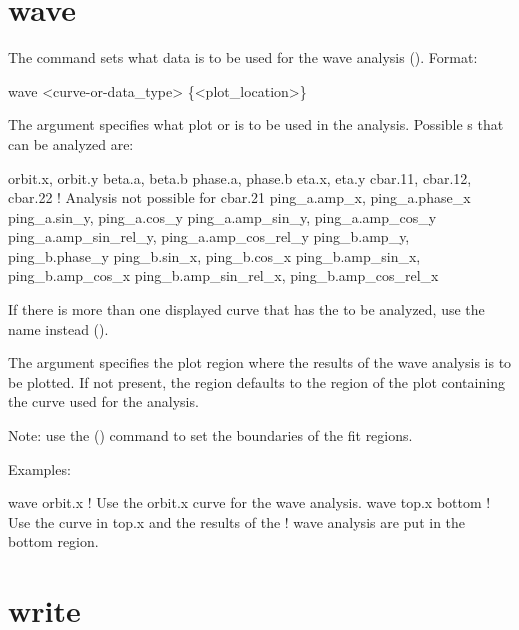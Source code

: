 {{{{{{{{{{{\section{wave}
\label{s:wave}

The  command sets what data is to be used for the wave analysis (). 
Format:
\begin{example}
  wave <curve-or-data_type> \{<plot_location>\}
\end{example}

\vskip 7pt

The  argument specifies what plot  or  is to be
used in the analysis. Possible s that can be analyzed are:
\begin{example}
  orbit.x, orbit.y
  beta.a,  beta.b
  phase.a, phase.b
  eta.x, eta.y
  cbar.11, cbar.12, cbar.22      ! Analysis not possible for cbar.21
  ping_a.amp_x, ping_a.phase_x
  ping_a.sin_y, ping_a.cos_y
  ping_a.amp_sin_y, ping_a.amp_cos_y
  ping_a.amp_sin_rel_y, ping_a.amp_cos_rel_y
  ping_b.amp_y, ping_b.phase_y
  ping_b.sin_x, ping_b.cos_x
  ping_b.amp_sin_x, ping_b.amp_cos_x
  ping_b.amp_sin_rel_x, ping_b.amp_cos_rel_x
\end{example}
If there is more than one displayed curve that has the  to be analyzed, use the
 name instead ().

The  argument specifies the plot region where the results of the wave analysis
is to be plotted. If not present, the region defaults to the region of the plot containing the curve
used for the analysis.

Note: use the  () command to set the boundaries of the fit regions.

Examples:
\begin{example}
  wave orbit.x      ! Use the orbit.x curve for the wave analysis.
  wave top.x bottom ! Use the curve in top.x and the results of the 
                    !  wave analysis are put in the bottom region.
\end{example}


\section{write}
\label{s:write}

}}}}}}}}}}}
